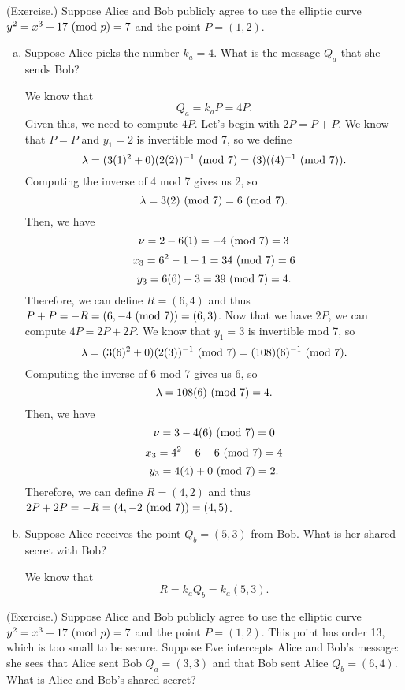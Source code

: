 \documentclass[letterpaper]{article}
\begin{document}
\begin{mdframed}
    (Exercise.) Suppose Alice and Bob publicly agree to use the elliptic curve $y^2 = x^3 + 17 \ (\mathrm{mod}\ p) = 7$ and the point $P = (1, 2)$. 
    \begin{enumerate}[(a)]
        \item Suppose Alice picks the number $k_a = 4$. What is the message $Q_a$ that she sends Bob? 
        \begin{mdframed}
            We know that \[Q_a = k_a P = 4P.\] Given this, we need to compute $4P$. Let's begin with $2P = P + P$. We know that $P = P$ and $y_1 = 2$ is invertible mod 7, so we define 
            \[\lambda = (3(1)^2 + 0)(2(2))^{-1} \ (\mathrm{mod}\ 7) = (3)((4)^{-1} \ (\mathrm{mod}\ 7)).\]
            Computing the inverse of 4 mod 7 gives us 2, so 
            \[\lambda = 3(2) \ (\mathrm{mod}\ 7) = 6 \ (\mathrm{mod}\ 7).\]
            Then, we have 
            \[\nu = 2 - 6(1) = -4 \ (\mathrm{mod}\ 7) = 3\]
            \[x_3 = 6^2 - 1 - 1 = 34 \ (\mathrm{mod}\ 7) = 6\]
            \[y_3 = 6(6) + 3 = 39 \ (\mathrm{mod}\ 7) = 4.\]
            Therefore, we can define $R = (6, 4)$ and thus $P + P = -R = (6, -4 \ (\mathrm{mod}\ 7)) = (6, 3)$. Now that we have $2P$, we can compute $4P = 2P + 2P$. We know that $y_1 = 3$ is invertible mod 7, so 
            \[\lambda = (3(6)^2 + 0)(2(3))^{-1} \ (\mathrm{mod}\ 7) = (108)(6)^{-1} \ (\mathrm{mod}\ 7).\]
            Computing the inverse of 6 mod 7 gives us 6, so 
            \[\lambda = 108(6) \ (\mathrm{mod}\ 7) = 4.\]
            Then, we have 
            \[\nu = 3 - 4(6) \ (\mathrm{mod}\ 7) = 0\]
            \[x_3 = 4^2 - 6 - 6 \ (\mathrm{mod}\ 7) = 4\]
            \[y_3 = 4(4) + 0 \ (\mathrm{mod}\ 7) = 2.\]
            Therefore, we can define $R = (4, 2)$ and thus $2P + 2P = -R = (4, -2 \ (\mathrm{mod}\ 7)) = (4, 5)$.
        \end{mdframed}
        \item Suppose Alice receives the point $Q_b = (5, 3)$ from Bob. What is her shared secret with Bob?
        \begin{mdframed}
            We know that 
            \[R = k_a Q_b = k_a (5, 3).\] 
        \end{mdframed}
    \end{enumerate}
\end{mdframed}

\begin{mdframed}
    (Exercise.) Suppose Alice and Bob publicly agree to use the elliptic curve $y^2 = x^3 + 17 \ (\mathrm{mod}\ p) = 7$ and the point $P = (1, 2)$. This point has order 13, which is too small to be secure. Suppose Eve intercepts Alice and Bob's message: she sees that Alice sent Bob $Q_a = (3, 3)$ and that Bob sent Alice $Q_b = (6, 4)$. What is Alice and Bob's shared secret? 
    \begin{mdframed}
        
    \end{mdframed}
\end{mdframed}
\end{document}
